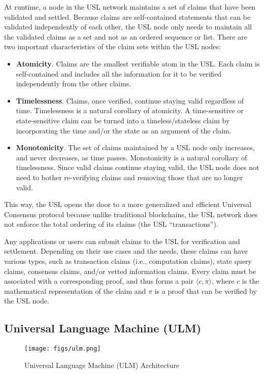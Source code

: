 \documentclass{article}
\begin{document}
At runtime, a node in the USL network maintains a set of claims that have been validated and settled. 
Because claims are self-contained statements that can be validated independently of each other, 
the USL node only needs to maintain all the validated claims as a set and not as an ordered sequence or list. 
There are two important characteristics of the claim sets within the USL nodes:
\begin{itemize}
    \item \textbf{Atomicity}. Claims are the smallest verifiable atom in the USL. 
     Each claim is self-contained and includes all the information for it to be 
     verified independently from the other claims. 
    \item \textbf{Timelessness}. Claims, once verified, continue staying valid regardless of time.  
     Timelessness is a natural corollary of atomicity. A time-sensitive or state-sensitive claim can be turned into
     a timeless/stateless claim by incorporating the time and/or the state as an argument of the claim. 
    \item \textbf{Monotonicity}. The set of claims maintained by a USL node only increases, and never decreases, as time passes. Monotonicity is a natural corollary of timelessness. Since valid claims continue staying valid, the USL node does not need to bother re-verifying claims and removing those that are no longer valid. 
\end{itemize}
This way, the USL opens the door to a more generalized and efficient Universal Consensus protocol
because unlike traditional blockchains, the USL network does not enforce the total ordering of its claims
(the USL ``transactions'').

Any applications or users can submit claims to the USL for verification and settlement. 
Depending on their use cases and the needs, these claims can have various types,
such as transaction claims (i.e., computation claims), 
state query claims, consensus claims, and/or vetted information claims. 
Every claim must be associated with a corresponding proof, and thus forms
a pair $\langle c, \pi \rangle$, where $c$ is the mathematical representation of the claim
and $\pi$ is a proof that can be verified by the USL node. 

\subsection{Universal Language Machine (ULM)}

\begin{figure}
\centering
\texttt{[image: figs/ulm.png]}
\caption{Universal Language Machine (ULM) Architecture}
\label{fig:ulm}
\end{figure}
\end{document}
